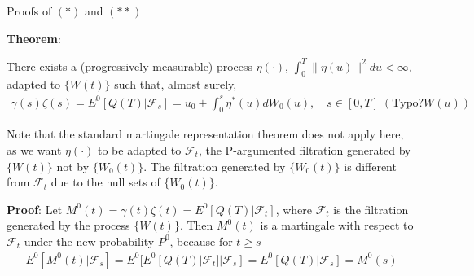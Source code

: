 \documentclass{beamer}
\begin{document}
\begin{frame}{Proofs of $(*)$ and $(**)$}

    {\footnotesize \footnotesize
   
    \par \textbf{Theorem}:
     \vspace{1em}
    \par There exists a (progressively measurable) process \(\eta(\cdot)\), 
    \(\int_0^T \|\eta(u)\|^2 du < \infty\), adapted to \(\{W(t)\}\) such that, almost surely,
    \begin{align*}
        \gamma(s) \zeta(s) = E^0[Q(T) | \mathcal{F}_s] = u_0 + \int_0^s \eta^*(u) dW_0(u), \quad s \in [0,T]\; (\text{Typo?}W(u))
    \end{align*}
     \vspace{1em}
    \par  \pause Note that the standard martingale representation theorem does not
     apply here, as we want \(\eta(\cdot)\) to be adapted to \(\mathcal{F}_t\), 
     the P-argumented filtration generated by \(\{W(t)\}\) not by \(\{W_0(t)\}\). 
     The filtration generated by \(\{W_0(t)\}\) is different from \(\mathcal{F}_t\) due to the null sets of \(\{W_0(t)\}\).
     \vspace{1em}
    \par  \pause \textbf{Proof}: Let $M^0(t) = \gamma(t) \zeta(t) = E^0[Q(T) | \mathcal{F}_t]$, where \(\mathcal{F}_t\) is 
    the filtration generated by the process \(\{W(t)\}\). 
    Then \(M^0(t)\) is a martingale with respect to \(\mathcal{F}_t\) under the new probability \(P^0\), because for \(t \geq s\)
    \begin{align*}
        E^0[M^0(t) | \mathcal{F}_s] = E^0[E^0[Q(T) | \mathcal{F}_t] | \mathcal{F}_s] = E^0[Q(T) | \mathcal{F}_s] = M^0(s)
    \end{align*}
    }

\end{frame}
\end{document}
